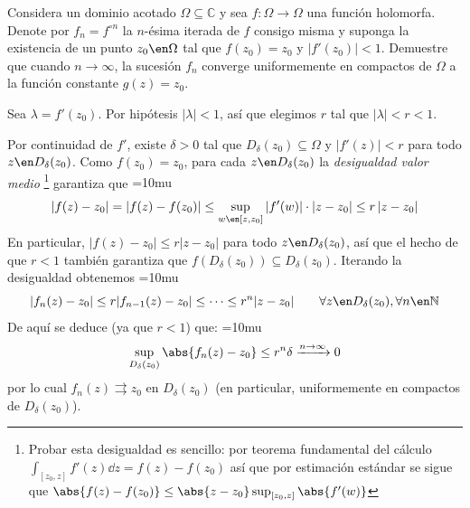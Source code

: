 \setcounter{neje}{1}
\begin{nejer}
Considera un dominio acotado $\Omega \subseteq \mathbb{C}$ y sea $f\colon \Omega \to \Omega$ una función holomorfa. Denote por $f_n = f^{\circ n}$ la $n$-ésima iterada de $f$ consigo misma y suponga la existencia de un punto $z_0 \en \Omega$ tal que $f(z_0) = z_0$ y $|f'(z_0)| < 1$. Demuestre que cuando $n \to \infty$, la sucesión $f_n$ converge uniformemente en compactos de $\Omega$ a la función constante $g(z) = z_0$.
\end{nejer}
\begin{sol}
Sea $\lambda = f'(z_0)$. Por hipótesis $|\lambda| < 1$, así que elegimos $r$ tal que $|\lambda| < r < 1$.

Por continuidad de $f'$, existe $\delta > 0$ tal que $D_{\delta}(z_0) \subseteq \Omega$ y $|f'(z)| < r$ para todo $z \en D_{\delta}(z_0)$. Como $f(z_0)=z_0$, para cada $z \en D_{\delta}(z_0)$ la \emph{desigualdad valor medio}%
\footnote{
    Probar esta desigualdad es sencillo: por teorema fundamental del cálculo $\int_{[z_0,z]}f'(z) \dd{z} = f(z)-f(z_0)$ así que por estimación estándar se sigue que $\abs{f(z) - f(z_0)} \leq \abs{z-z_0} \sup_{[z_0,z]}\abs{f'(w)}$
} %
garantiza que 
{\thickmuskip=10mu
\[
|f(z) - z_0| = |f(z)-f(z_0)| \le \sup_{w\en [z,z_0]}|f'(w)| \cdot|z - z_0| \le r\,|z - z_0|
\]}%
En particular, $|f(z) - z_0| \le r|z - z_0|$ para todo $z\en D_{\delta}(z_0)$, así que el hecho de que $r<1$ también garantiza que $f(D_{\delta}(z_0)) \subseteq D_{\delta}(z_0)$. Iterando la desigualdad obtenemos
{\thickmuskip=10mu
\[
|f_n(z) - z_0| \le r|f_{n-1}(z)-z_0| \le \cdots \le r^n |z - z_0| \qquad \forall z \en D_{\delta}(z_0), \forall n \en \mathbb{N}
\]}%
De aquí se deduce (ya que $r<1$) que:
{\thickmuskip=10mu
\[
\sup_{D_{\delta}(z_0)} \abs{f_n(z)-z_0} \leq r^n\delta \xrightarrow{n\to\infty} 0
\]}%
por lo cual $f_n(z) \rightrightarrows z_0$ en $D_{\delta}(z_0)$ (en particular, uniformemente en compactos de $D_{\delta}(z_0)$).


\end{sol}

